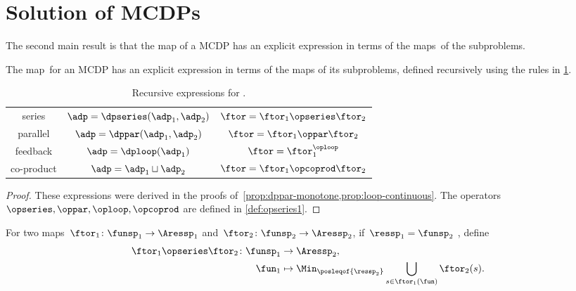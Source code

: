 
\section{Solution of MCDPs}
\label{sec:Solution-of-Monotone}

The second main result is that the map \ftor of a MCDP has an explicit expression in terms of the maps~\ftor of the subproblems.

\begin{theorem}
	\label{thm:CDP-solvig}
	The map~\ftor for an MCDP has an explicit expression in terms of the maps \ftor of its subproblems, defined recursively using the rules in \cref{tab:correspondence}.
\end{theorem}

\begin{table}[h]
	\caption{Recursive expressions for \ftor.}
	\label{tab:correspondence}
	\centering{}\setlength\extrarowheight{5pt}\normalsize
	\begin{tabular}{ccc}
		series     & $\adp=\dpseries(\adp_{1},\adp_{2})$ & $\ftor=\ftor_{1}\opseries\ftor_{2}$\tabularnewline
		parallel   & $\adp=\dppar(\adp_{1},\adp_{2})$    & $\ftor=\ftor_{1}\oppar\ftor_{2}$\tabularnewline
		feedback   & $\adp=\dploop(\adp_{1})$            & $\ftor=\ftor_{1}^{\oploop}$\tabularnewline
		co-product & $\adp=\adp_{1}\sqcup\adp_{2}$       & $\ftor=\ftor_{1}\opcoprod\ftor_{2}$\tabularnewline
	\end{tabular}
\end{table}

\begin{proof}
	These expressions were derived in the proofs of~\cref{prop:dppar-monotone,prop:loop-continuous}.
	The operators $\opseries,\oppar,\oploop,\opcoprod$ are defined in \cref{def:opseries1}.
\end{proof}
\begin{definition}
	\label{def:opseries1}
	For two maps~$\ftor_{1}\colon\funsp_{1}\rightarrow\Aressp_{1}$
	and~$\ftor_{2}\colon\funsp_{2}\rightarrow\Aressp_{2}$, if~$\ressp_{1}=\funsp_{2}$
	, define
	\begin{align*}
		{\displaystyle \ftor_{1}\opseries\ftor_{2}\colon\funsp_{1}}
		         & \rightarrow\Aressp_{2},                                                       \\
		\fun_{1} & \mapsto\Min_{\posleqof{\ressp_{2}}}\bigcup_{s\in\ftor_{1}(\fun)}\ftor_{2}(s).
	\end{align*}
\end{definition}

